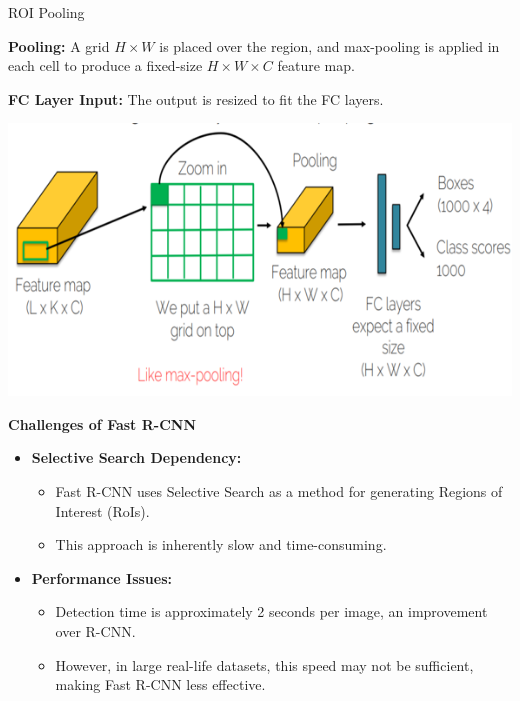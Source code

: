 \documentclass{beamer}
\begin{document}
\begin{frame}{ROI Pooling}

    \textbf{Pooling:} 
    A grid \( H \times W \) is placed over the region, and max-pooling is applied in each cell to produce a fixed-size \( H \times W \times C \) feature map.

    \textbf{FC Layer Input:} 
    The output is resized to fit the FC layers.
    
    \vspace{0.4cm}
    \centering
    \includegraphics[width=0.8\linewidth]{slide11.png}

\end{frame}
\begin{frame}{\textbf{Challenges of Fast R-CNN}}
    \begin{itemize}
        \item \textbf{Selective Search Dependency:}
        \begin{itemize}
            \item Fast R-CNN uses Selective Search as a method for generating Regions of Interest (RoIs).
            \item This approach is inherently slow and time-consuming.
        \end{itemize}
        
        \item \textbf{Performance Issues:}
        \begin{itemize}
            \item Detection time is approximately 2 seconds per image, an improvement over R-CNN.
            \item However, in large real-life datasets, this speed may not be sufficient, making Fast R-CNN less effective.
        \end{itemize}
    \end{itemize}
\end{frame}
\end{document}
